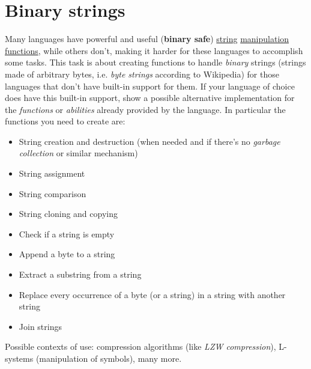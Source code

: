 \pagebreak{}
\section*{Binary strings}


Many languages have powerful and useful (\textbf{binary safe})
\href{http://en.wikipedia.org/wiki/String\_(computer\_science)}{string}
\href{http://en.wikipedia.org/wiki/Comparison\_of\_programming\_languages\_(string\_functions)}{manipulation
functions}, while others don't, making it harder for these languages to
accomplish some tasks. This task is about creating functions to handle
\emph{binary} strings (strings made of arbitrary bytes, i.e. \emph{byte
strings} according to Wikipedia) for those languages that don't have
built-in support for them. If your language of choice does have this
built-in support, show a possible alternative implementation for the
\emph{functions} or \emph{abilities} already provided by the language.
In particular the functions you need to create are:

\begin{itemize}
\item
  String creation and destruction (when needed and if there's no
  \emph{garbage collection} or similar
  mechanism)
\item
  String assignment
\item
  String comparison
\item
  String cloning and copying
\item
  Check if a string is empty
\item
  Append a byte to a string
\item
  Extract a substring from a string
\item
  Replace every occurrence of a byte (or a string) in a string with
  another string
\item
  Join strings
\end{itemize}

Possible contexts of use: compression algorithms (like \emph{LZW
  compression}), L-systems (manipulation of symbols), many more.


